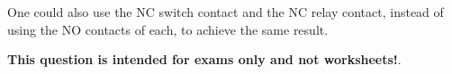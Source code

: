 One could also use the NC switch contact and the NC relay contact, instead of using the NO contacts of each, to achieve the same result.







{\bf This question is intended for exams only and not worksheets!}.




